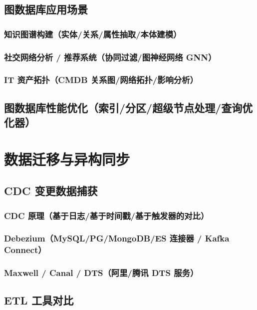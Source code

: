 \documentclass[12pt,UTF8]{ctexbook}
\begin{document}
  \section{图数据库应用场景}
    \subsection{知识图谱构建（实体/关系/属性抽取/本体建模）}
    \subsection{社交网络分析 / 推荐系统（协同过滤/图神经网络 GNN）}
    \subsection{IT 资产拓扑（CMDB 关系图/网络拓扑/影响分析）}

  \section{图数据库性能优化（索引/分区/超级节点处理/查询优化器）}


\chapter{数据迁移与异构同步}
\label{chap:data-migration}

  \section{CDC 变更数据捕获}
    \subsection{CDC 原理（基于日志/基于时间戳/基于触发器的对比）}
    \subsection{Debezium（MySQL/PG/MongoDB/ES 连接器 / Kafka Connect）}
    \subsection{Maxwell / Canal / DTS（阿里/腾讯 DTS 服务）}

  \section{ETL 工具对比}
\end{document}
